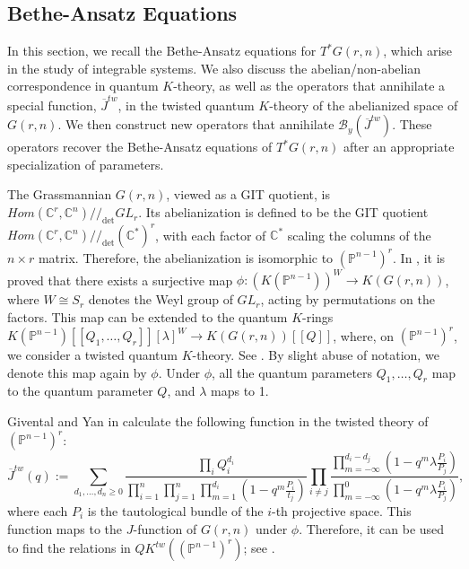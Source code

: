 \documentclass{amsart}
\begin{document}
\subsection{Bethe-Ansatz Equations}\label{Bethe section}
In this section, we recall the Bethe-Ansatz equations for $T^*G(r,n)$, which arise in the study of integrable systems. We also discuss the abelian/non-abelian correspondence in quantum $K$-theory, as well as the operators that annihilate a special function, $\overline{J}^{tw}$, in the twisted quantum $K$-theory of the abelianized space of $G(r,n)$. We then construct new operators that annihilate $\mathcal{B}_y(\overline{J}^{tw})$. These operators recover the Bethe-Ansatz equations of $T^*G(r,n)$ after an appropriate specialization of parameters. 

The Grassmannian $G(r,n)$, viewed as a GIT quotient, is $Hom(\mathbb{C}^r ,\mathbb{C}^n)//_{\det} GL_r$. Its abelianization is defined to be the GIT quotient $Hom(\mathbb{C}^r , \mathbb{C}^n)//_{\det} {(\mathbb{C}^*)}^r$, with each factor of $\mathbb{C}^*$ scaling the columns of the $n \times r$ matrix. Therefore, the abelianization is isomorphic to $(\mathbb{P}^{n-1})^r$. In \cite{MR2367174}, it is proved that there exists a surjective map $\phi:(K(\mathbb{P}^{n-1}))^W \to K(G(r,n))$, where $W \cong S_r$ denotes the Weyl group of $GL_r$, acting by permutations on the factors. This map can be extended to the quantum $K$-rings $K(\mathbb{P}^{n-1})[[Q_1,\dots,Q_r]][\lambda]^W \to K(G(r,n))[[Q]]$, where, on $(\mathbb{P}^{n-1})^r$, we consider a twisted quantum $K$-theory. See \cite{huqkuruvilla2025relationstwistedquantumkrings}. By slight abuse of notation, we denote this map again by $\phi$. Under $\phi$, all the quantum parameters $Q_1,\dots,Q_r$ map to the quantum parameter $Q$, and $\lambda$ maps to 1. 

Givental and Yan in \cite{Givental:2020} calculate the following function in the twisted theory of $(\mathbb{P}^{n-1})^r$:
\begin{equation*}\label{twisted function}
\overline{J}^{tw}(q):=\sum_{d_1,\dots,d_n\geq 0}\frac{\prod_iQ_i^{d_i}}{\prod_{i=1}^n\prod_{j=1}^{n}\prod_{m=1}^{d_i}(1-q^m\frac{P_i}{t_j})}\prod_{i\neq j}\frac{\prod_{m=-\infty}^{d_i-d_j} (1-q^m\lambda\frac{P_i}{P_j})}{\prod_{m=-\infty}^{0} (1-q^m\lambda\frac{P_i}{P_j})},
\end{equation*}
where each $P_i$ is the tautological bundle of the $i$-th projective space.
This function maps to the $J$-function of $G(r,n)$ under $\phi$. Therefore, it can be used to find the relations in $QK^{tw}((\mathbb{P}^{n-1})^r)$; see \cite{huqkuruvilla2025relationstwistedquantumkrings}.
\end{document}
